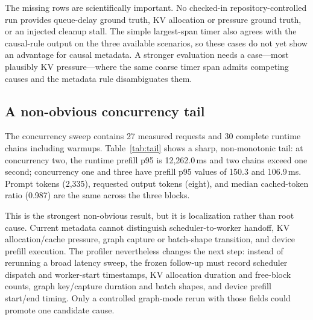\documentclass[sigconf,screen,nonacm]{acmart}
\begin{document}
\begin{table}[t]
\centering
\caption{Coverage audit over checked-in NPU6 artifacts. Available measurements
are probes of an existing server, and the table is derived from those probes.
The concurrency tail is an observation, not a controlled-fault row.}
\label{tab:coverage}

\end{table}

\balance

The missing rows are scientifically important. No checked-in
repository-controlled run provides queue-delay ground truth, KV allocation or
pressure ground truth, or an injected cleanup stall. The simple largest-span
timer also agrees with the causal-rule output on the three available scenarios,
so these cases do not yet show an advantage for causal metadata. A stronger
evaluation needs a case---most plausibly KV pressure---where the same coarse
timer span admits competing causes and the metadata rule disambiguates them.

\subsection{A non-obvious concurrency tail}

The concurrency sweep contains 27 measured requests and 30 complete runtime
chains including warmups. Table~\ref{tab:tail} shows a sharp, non-monotonic
tail: at concurrency two, the runtime prefill p95 is 12,262.0\,ms and two
chains exceed one second; concurrency one and three have prefill p95 values of
150.3 and 106.9\,ms. Prompt tokens (2,335), requested output tokens (eight),
and median cached-token ratio (0.987) are the same across the three blocks.

\begin{table}[H]
\centering
\caption{Post-hoc analysis of existing-server runtime traces. The two
12.2\,s-class events are inside \texttt{scheduled}$\rightarrow$
\texttt{prefill\_done}; the table does not identify a prefill substage cause.}
\label{tab:tail}

\end{table}

This is the strongest non-obvious result, but it is localization rather than
root cause. Current metadata cannot distinguish scheduler-to-worker handoff,
KV allocation/cache pressure, graph capture or batch-shape transition, and
device prefill execution. The profiler nevertheless changes the next step:
instead of rerunning a broad latency sweep, the frozen follow-up must record
scheduler dispatch and worker-start timestamps, KV allocation duration and
free-block counts, graph key/capture duration and batch shapes, and device
prefill start/end timing. Only a controlled graph-mode rerun with those fields
could promote one candidate cause.
\end{document}
